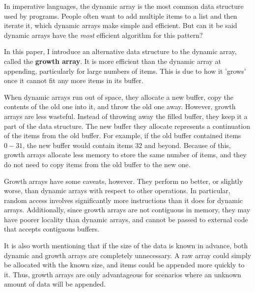 In imperative languages, the dynamic array is the most common data structure used by programs. People often want to add multiple items to a list and then iterate it, which dynamic arrays make simple and efficient. But can it be said dynamic arrays have the \textit{most} efficient algorithm for this pattern?

In this paper, I introduce an alternative data structure to the dynamic array, called the \textbf{growth array}. It is more efficient than the dynamic array at appending, particularly for large numbers of items. This is due to how it 'grows' once it cannot fit any more items in its buffer.

When dynamic arrays run out of space, they allocate a new buffer, copy the contents of the old one into it, and throw the old one away. However, growth arrays are less wasteful. Instead of throwing away the filled buffer, they keep it a part of the data structure. The new buffer they allocate represents a continuation of the items from the old buffer. For example, if the old buffer contained items $0-31$, the new buffer would contain items $32$ and beyond. Because of this, growth arrays allocate less memory to store the same number of items, and they do not need to copy items from the old buffer to the new one.

Growth arrays have some caveats, however. They perform no better, or slightly worse, than dynamic arrays with respect to other operations. In particular, random access involves significantly more instructions than it does for dynamic arrays. Additionally, since growth arrays are not contiguous in memory, they may have poorer locality than dynamic arrays, and cannot be passed to external code that accepts contiguous buffers.

It is also worth mentioning that if the size of the data is known in advance, both dynamic and growth arrays are completely unnecessary. A raw array could simply be allocated with the known size, and items could be appended more quickly to it. Thus, growth arrays are only advantageous for scenarios where an unknown amount of data will be appended.